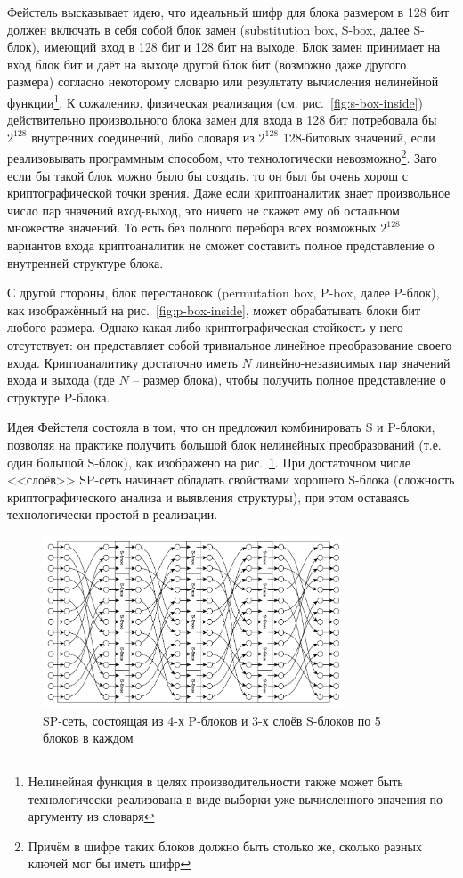 Фейстель высказывает идею, что идеальный шифр для блока размером в 128 бит должен включать в себя собой блок замен (substitution box, S-box, далее S-блок), имеющий вход в 128 бит и 128 бит на выходе. Блок замен принимает на вход блок бит и даёт на выходе другой блок бит (возможно даже другого размера) согласно некоторому словарю или результату вычисления нелинейной функции\footnote{Нелинейная функция в целях производительности также может быть технологически реализована в виде выборки уже вычисленного значения по аргументу из словаря}. К сожалению, физическая реализация (см. рис.~\ref{fig:s-box-inside}) действительно произвольного блока замен для входа в 128 бит потребовала бы $2^{128}$ внутренних соединений, либо словаря из $2^{128}$ 128-битовых значений, если реализовывать программным способом, что технологически невозможно\footnote{Причём в шифре таких блоков должно быть столько же, сколько разных ключей мог бы иметь шифр}. Зато если бы такой блок можно было бы создать, то он был бы очень хорош с криптографической точки зрения. Даже если криптоаналитик знает произвольное число пар значений вход-выход, это ничего не скажет ему об остальном множестве значений. То есть без полного перебора всех возможных $2^{128}$ вариантов входа криптоаналитик не сможет составить полное представление о внутренней структуре блока.

С другой стороны, блок перестановок (permutation box, P-box, далее P-блок), как изображённый на рис.~\ref{fig:p-box-inside}, может обрабатывать блоки бит любого размера. Однако какая-либо криптографическая стойкость у него отсутствует: он представляет собой тривиальное линейное преобразование своего входа. Криптоаналитику достаточно иметь $N$ линейно-независимых пар значений входа и выхода (где $N$ -- размер блока), чтобы получить полное представление о структуре P-блока.

Идея Фейстеля состояла в том, что он предложил комбинировать S и P-блоки, позволяя на практике получить большой блок нелинейных преобразований (т.е. один большой S-блок), как изображено на рис.~\ref{fig:sp-network}. При достаточном числе <<слоёв>> SP-сеть начинает обладать свойствами хорошего S-блока (сложность криптографического анализа и выявления структуры), при этом оставаясь технологически простой в реализации.

\begin{figure}[htb]
	\centering
	\includegraphics[width=0.8\textwidth]{pic/sp-network}
  \caption{SP-сеть, состоящая из 4-х P-блоков и 3-х слоёв S-блоков по 5 блоков в каждом}
  \label{fig:sp-network}
\end{figure}

